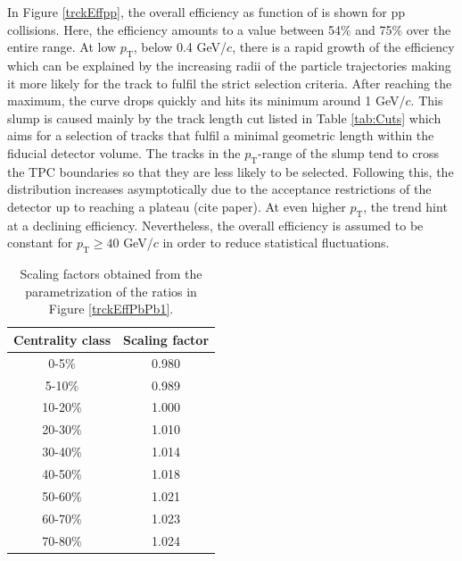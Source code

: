 \documentclass[12pt,a4paper]{report}
\begin{document}
\hspace{-0.3cm} In Figure \ref{trckEffpp}, the overall efficiency as function of \pt is shown for pp collisions. Here, the efficiency amounts to a value between 54\% and 75\% over the entire \pt range. At low $p_\text{T}$, below 0.4 GeV/$c$, there is a rapid growth of the efficiency which can be explained by the increasing radii of the particle trajectories making it more likely for the track to fulfil the strict selection criteria. After reaching the maximum, the curve drops quickly and hits its minimum around 1 GeV/$c$. This slump is caused mainly by the track length cut listed in Table \ref{tab:Cuts} which aims for a selection of tracks that fulfil a minimal geometric length within the fiducial detector volume. The tracks in the $p_\text{T}$-range of the slump tend to cross the TPC boundaries so that they are less likely to be selected. Following this, the distribution increases asymptotically due to the acceptance restrictions of the detector up to reaching a plateau (cite paper). At even higher $p_\text{T}$, the trend hint at a declining efficiency. Nevertheless, the overall efficiency is assumed to be constant for $p_\text{T} \geq 40$ GeV/$c$ in order to reduce statistical fluctuations. 
\begin{table}[tb!]
\centering
\renewcommand{\arraystretch}{1.5}
\begin{tabular}{|c|c|}
\toprule
\rowcolor{headerBlue} \textbf{Centrality class} &  \textbf{Scaling factor}\\
\midrule
0-5\%	&	0.980	 \\
5-10\%	&	0.989	 \\
10-20\%	&	1.000	 \\
20-30\%	&	1.010	 \\
30-40\%	&	1.014	 \\
40-50\%	&	1.018	 \\
50-60\%	&	1.021	 \\
60-70\%	&	1.023	 \\
70-80\%	&	1.024	 \\
\bottomrule
\end{tabular}
\caption{Scaling factors obtained from the parametrization of the ratios in Figure \ref{trckEffPbPb1}.}
\label{tab:ScalingFactors}
\end{table}
\end{document}

